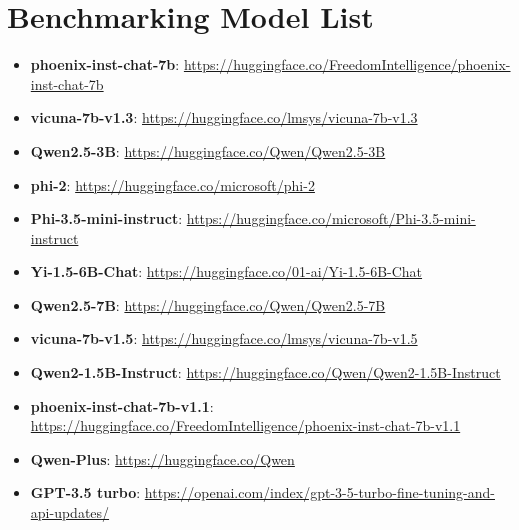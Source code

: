 \section{Benchmarking Model List}
\label{sec:bench_model_list}
\begin{itemize}
\item \textbf{phoenix-inst-chat-7b}: \url{https://huggingface.co/FreedomIntelligence/phoenix-inst-chat-7b}
\item \textbf{vicuna-7b-v1.3}: \url{https://huggingface.co/lmsys/vicuna-7b-v1.3}
\item \textbf{Qwen2.5-3B}: \url{https://huggingface.co/Qwen/Qwen2.5-3B}
\item \textbf{phi-2}: \url{https://huggingface.co/microsoft/phi-2}
\item \textbf{Phi-3.5-mini-instruct}: \url{https://huggingface.co/microsoft/Phi-3.5-mini-instruct}
\item \textbf{Yi-1.5-6B-Chat}: \url{https://huggingface.co/01-ai/Yi-1.5-6B-Chat}
\item \textbf{Qwen2.5-7B}: \url{https://huggingface.co/Qwen/Qwen2.5-7B}
\item \textbf{vicuna-7b-v1.5}: \url{https://huggingface.co/lmsys/vicuna-7b-v1.5}
\item \textbf{Qwen2-1.5B-Instruct}: \url{https://huggingface.co/Qwen/Qwen2-1.5B-Instruct}
\item \textbf{phoenix-inst-chat-7b-v1.1}: \url{https://huggingface.co/FreedomIntelligence/phoenix-inst-chat-7b-v1.1}
\item \textbf{Qwen-Plus}: \url{https://huggingface.co/Qwen} 
\item \textbf{GPT-3.5 turbo}: \url{https://openai.com/index/gpt-3-5-turbo-fine-tuning-and-api-updates/}
\end{itemize}


